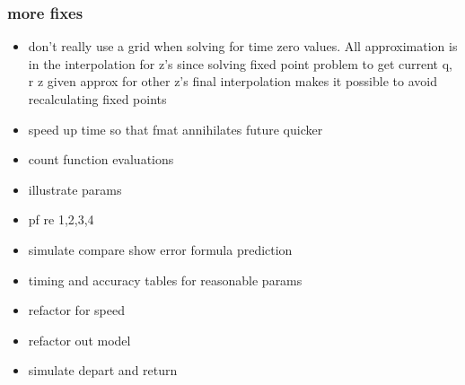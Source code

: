 \documentclass{beamer}
\begin{document}
%  
%     
%
%
%
%  
%     
%
%  
%
%
%
%
%
%  
%  
%
%
%  
%     
%
%
%
%
%  
%     
%
%
%  
%     
%
%

    \begin{frame}
      \frametitle{more fixes}
      

      \begin{itemize}
      \item don't really use a grid when solving for time zero values.  All approximation is in the interpolation for z's since solving fixed point problem to get current q, r z given approx for other z's  final interpolation makes it possible to avoid recalculating fixed points
      	\item speed up time so that fmat annihilates future quicker
      	\item count function evaluations
      \item illustrate params
      \item pf re 1,2,3,4
      \item simulate compare show error formula prediction
      \item timing and accuracy tables for reasonable params
      \item refactor for speed
      \item refactor out model
      \item simulate depart and return
      \end{itemize}
    \end{frame}
    
\end{document}
